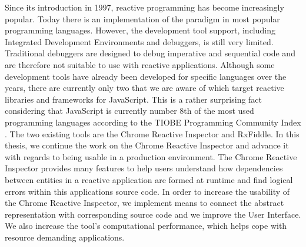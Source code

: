 Since its introduction in 1997, reactive programming has become increasingly popular. Today there is an implementation of the paradigm in most popular programming languages. However, the development tool support, including Integrated Development Environments and debuggers, is still very limited. Traditional debuggers are designed to debug imperative and sequential code and are therefore not suitable to use with reactive applications. Although some development tools have already been developed for specific languages over the years, there are currently only two that we are aware of which target reactive libraries and frameworks for JavaScript. This is a rather surprising fact considering that JavaScript is currently number 8th of the most used programming languages according to the TIOBE Programming Community Index \cite{LanguageIndex}. The two existing tools are the Chrome Reactive Inspector and RxFiddle.
In this thesis, we continue the work on the Chrome Reactive Inspector and advance it with regards to being usable in a production environment. The Chrome Reactive Inspector provides many features to help users understand how dependencies between entities in a reactive application are formed at runtime and find logical errors within this applications source code. In order to increase the usability of the Chrome Reactive Inspector, we implement means to connect the abstract representation with corresponding source code and we improve the User Interface. We also increase the tool's computational performance, which helps cope with resource demanding applications.